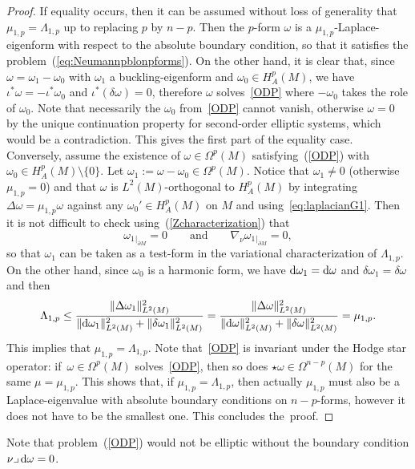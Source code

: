 \documentclass[pdftex]{sigma}
\numberwithin{equation}{section}
\theoremstyle{definition}
\begin{document}
\begin{proof}
If equality occurs, then it can be assumed without loss of generality that $\mu_{1,p}=\Lambda_{1,p}$ up to replacing $p$ by $n-p$.
Then the $p$-form $\omega$ is a $\mu_{1,p}$-Laplace-eigenform with respect to the absolute boundary condition, so that it satisfies the problem~(\ref{eq:Neumannpblonpforms}).
On the other hand, it is clear that, since $\omega=\omega_1-\omega_0$
with $\omega_1$ a buckling-eigenform and $\omega_0\in H^p_A(M)$, we have $\iota^*\omega=-\iota^*\omega_0$ and ${\iota^*(\delta\omega)=0}$, therefore $\omega$ solves~\eqref{ODP} where $-\omega_0$ takes the role of $\omega_0$.
Note that necessarily the $\omega_0$ from~\eqref{ODP} cannot vanish, otherwise $\omega=0$ by the unique continuation property for second-order elliptic systems, which would be a contradiction.
This gives the first part of the equality case.
Conversely, assume the existence of $\omega\in\Omega^p(M)$ satisfying~(\ref{ODP}) with $\omega_0\in H^p_A(M)\setminus\{0\}$.
Let $\omega_1:=\omega-\omega_0\in\Omega^p(M)$.
Notice that $\omega_1\neq0$ (otherwise $\mu_{1,p}=0$) and that $\omega$ is $L^2(M)$-orthogonal to $H_A^p(M)$ by integrating $\Delta\omega=\mu_{1,p}\omega$ against any $\omega_0'\in H_A^p(M)$ on $M$ and using~\eqref{eq:laplacianG1}.
Then it is not difficult to check using~(\ref{Zcharacterization}) that
\[
\omega_{1}{}_{|_{\partial M}}=0\qquad\text{and}\qquad\nabla_\nu\omega_{1}{}_{|_{\partial M}}=0,
\]
so that $\omega_1$ can be taken as a test-form in the variational characterization of $\Lambda_{1,p}$.
On the other hand, since $\omega_0$ is a harmonic form, we have ${\rm d}\omega_1={\rm d}\omega$ and $\delta\omega_1=\delta\omega$ and then
\[
\Lambda_{1,p}\leq\frac{\|\Delta\omega_1\|^2_{L^2(M)}}{\|{\rm d}\omega_1\|^2_{L^2(M)}+\|\delta\omega_1\|^2_{L^2(M)}}=\frac{\|\Delta\omega\|^2_{L^2(M)}}{\|{\rm d}\omega\|^2_{L^2(M)}+\|\delta\omega\|^2_{L^2(M)}}=\mu_{1,p}.
\]
This implies that $\mu_{1,p}=\Lambda_{1,p}$.
Note that~\eqref{ODP} is invariant under the Hodge star operator: if~${\omega\in\Omega^p(M)}$ solves~\eqref{ODP}, then so does $\star\omega\in\Omega^{n-p}(M)$ for the same $\mu=\mu_{1,p}$.
This shows that, if $\mu_{1,p}=\Lambda_{1,p}$, then actually $\mu_{1,p}$ must also be a Laplace-eigenvalue with absolute boundary conditions on $n-p$-forms, however it does not have to be the smallest one.
This concludes the~proof.
\end{proof}

Note that problem~(\ref{ODP}) would not be elliptic without the boundary condition $\nu\lrcorner\,{\rm d}\omega=0$.
\end{document}
